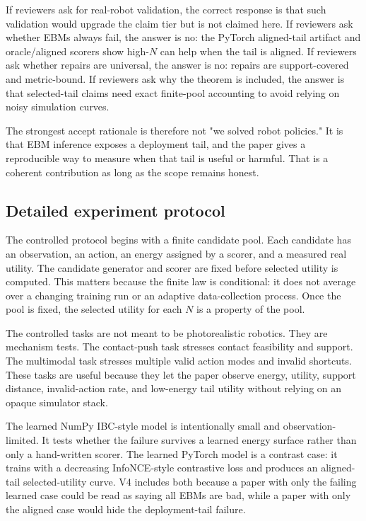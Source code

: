 If reviewers ask for real-robot validation, the correct response is that such
validation would upgrade the claim tier but is not claimed here. If reviewers
ask whether EBMs always fail, the answer is no: the PyTorch aligned-tail
artifact and oracle/aligned scorers show high-\(N\) can help when the tail is
aligned. If reviewers ask whether repairs are universal, the answer is no:
repairs are support-covered and metric-bound. If reviewers ask why the theorem
is included, the answer is that selected-tail claims need exact finite-pool
accounting to avoid relying on noisy simulation curves.

The strongest accept rationale is therefore not "we solved robot policies."
It is that EBM inference exposes a deployment tail, and the paper gives a
reproducible way to measure when that tail is useful or harmful. That is a
coherent contribution as long as the scope remains honest.

\subsection{Detailed experiment protocol}
\label{app:V4-detailed-protocol}

The controlled protocol begins with a finite candidate pool. Each candidate
has an observation, an action, an energy assigned by a scorer, and a measured
real utility. The candidate generator and scorer are fixed before selected
utility is computed. This matters because the finite law is conditional: it
does not average over a changing training run or an adaptive data-collection
process. Once the pool is fixed, the selected utility for each \(N\) is a
property of the pool.

The controlled tasks are not meant to be photorealistic robotics. They are
mechanism tests. The contact-push task stresses contact feasibility and
support. The multimodal task stresses multiple valid action modes and invalid
shortcuts. These tasks are useful because they let the paper observe energy,
utility, support distance, invalid-action rate, and low-energy tail utility
without relying on an opaque simulator stack.

The learned NumPy IBC-style model is intentionally small and
observation-limited. It tests whether the failure survives a learned energy
surface rather than only a hand-written scorer. The learned PyTorch model is a
contrast case: it trains with a decreasing InfoNCE-style contrastive loss and
produces an aligned-tail selected-utility curve. V4 includes both because a
paper with only the failing learned case could be read as saying all EBMs are
bad, while a paper with only the aligned case would hide the deployment-tail
failure.

